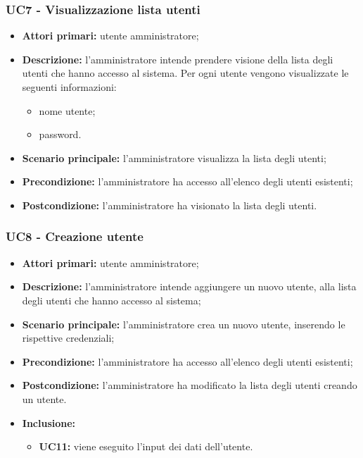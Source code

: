 
\subsubsection{UC7 - Visualizzazione lista utenti}
\begin{itemize}
	\item \textbf{Attori primari:} utente amministratore;
	\item \textbf{Descrizione:} l'amministratore intende prendere visione della lista degli utenti che hanno accesso al sistema. Per ogni utente vengono visualizzate le seguenti informazioni:
		\begin{itemize}
			\item nome utente;
			\item password.
		\end{itemize}
	\item \textbf{Scenario principale:} l'amministratore visualizza la lista degli utenti;
	\item \textbf{Precondizione:} l'amministratore ha accesso all'elenco degli utenti esistenti;
	\item \textbf{Postcondizione:} l'amministratore ha visionato la lista degli utenti.
\end{itemize}


\subsubsection{UC8 - Creazione utente}
	\begin{itemize}
		\item \textbf{Attori primari:} utente amministratore;
		\item \textbf{Descrizione:} l'amministratore intende aggiungere un nuovo utente, alla lista degli utenti che hanno accesso al sistema;
		\item \textbf{Scenario principale:} l'amministratore crea un nuovo utente, inserendo le rispettive credenziali;
		\item \textbf{Precondizione:} l'amministratore ha accesso all'elenco degli utenti esistenti;
		\item \textbf{Postcondizione:} l'amministratore ha modificato la lista degli utenti creando un utente.
		\item \textbf{Inclusione:} 
		\begin{itemize}
			\item \textbf{UC11:} viene eseguito l'input dei dati dell'utente.
		\end{itemize}
	\end{itemize}

